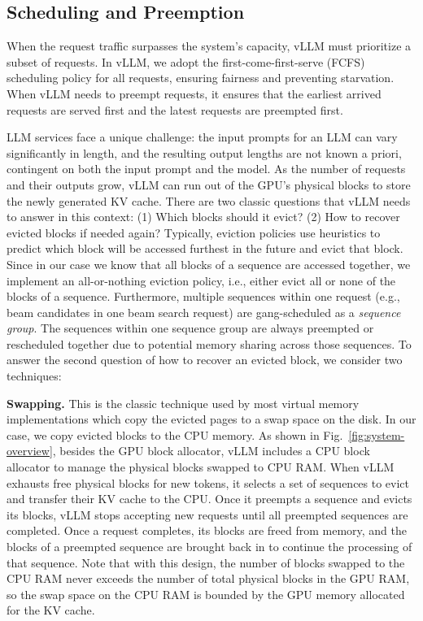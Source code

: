 \documentclass[sigplan,10pt]{acmart}
\newcommand{\sys}[0]{vLLM\xspace}
\newcommand{\heading}[1]{\vspace{4pt}\noindent\textbf{#1}}
\begin{document}
\subsection{Scheduling and Preemption}
\label{sec:scheduling}

When the request traffic surpasses the system’s capacity, \sys must prioritize a subset of requests. In \sys, we adopt the first-come-first-serve (FCFS) scheduling
policy for all requests, ensuring fairness and preventing starvation. When \sys needs to preempt requests, it ensures
that the earliest arrived requests are served first and the
latest requests are preempted first.

LLM services face a unique challenge: the input prompts for an LLM can vary significantly in length, and the resulting output lengths are not known a priori, contingent on both the input prompt and the model. As the number of requests and their outputs grow, \sys can run out of the GPU's physical blocks to store the newly generated KV cache. There are two classic questions that \sys needs to answer in this context: (1) Which blocks should it evict? (2) How to recover evicted blocks if needed again? Typically, eviction policies use heuristics to predict which block will be accessed furthest in the future and evict that block. Since in our case we know that all blocks of a sequence are accessed together, we implement an all-or-nothing eviction policy, i.e., either evict all or none of the blocks of a sequence. Furthermore, multiple sequences within one request (e.g., beam candidates in one beam search request) are gang-scheduled as a \emph{sequence group}. The sequences within one sequence group are always preempted or rescheduled together due to potential memory sharing across those sequences. 
To answer the second question of how to recover an evicted block, we consider two techniques:

\heading{Swapping.} This is the classic technique used by most virtual memory implementations which copy the evicted pages to a swap space on the disk. In our case, we copy evicted blocks to the CPU memory. As shown in Fig.~\ref{fig:system-overview}, besides the GPU block allocator, \sys includes a CPU block allocator to manage the physical blocks swapped to CPU RAM. When \sys exhausts free physical blocks for new tokens, it selects a set of sequences to evict and transfer their KV cache to the CPU. Once it preempts a sequence and evicts its blocks, \sys stops accepting new requests until all preempted sequences are completed. Once a request completes, its blocks are freed from memory, and the blocks of a preempted sequence are brought back in to continue the processing of that sequence.
Note that with this design, the number of blocks swapped to the CPU RAM never exceeds the number of total physical blocks in the GPU RAM, so the swap space on the CPU RAM is bounded by the GPU memory allocated for the KV cache. 
\end{document}
